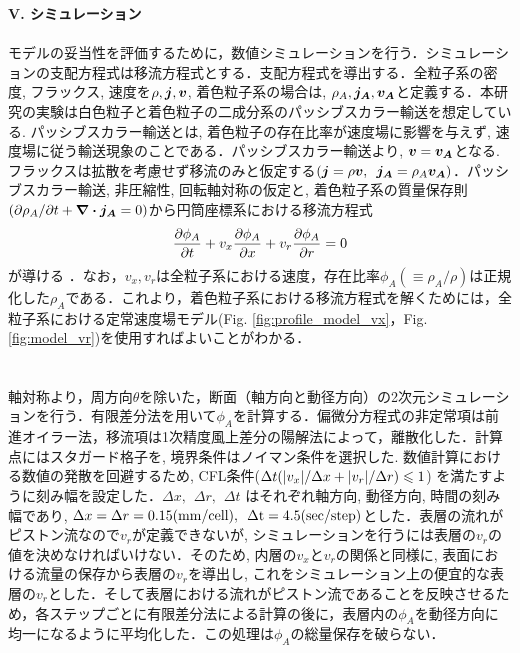 \documentclass[prl,twocolumn,superscriptaddress]{revtex4}
\begin{document}
{\bf V. シミュレーション} \\
 \\
モデルの妥当性を評価するために，数値シミュレーションを行う．シミュレーションの支配方程式は移流方程式とする．支配方程式を導出する．全粒子系の密度, フラックス, 速度を$\rho, \vb*{j}, \vb*{v}$, 着色粒子系の場合は, $\rho_A, \vb*{j_A}, \vb*{v_A}$と定義する．本研究の実験は白色粒子と着色粒子の二成分系のパッシブスカラー輸送を想定している. パッシブスカラー輸送とは, 着色粒子の存在比率が速度場に影響を与えず, 速度場に従う輸送現象のことである．パッシブスカラー輸送より, $\vb*{v} = \vb*{v_A}$となる. フラックスは拡散を考慮せず移流のみと仮定する$(\vb*{j} = \rho\vb*{v},\hspace{5pt}\vb*{j_A} = \rho_A\vb*{v_A})$．パッシブスカラー輸送, 非圧縮性, 回転軸対称の仮定と, 着色粒子系の質量保存則$\qty(\partial\rho_A/\partial t+\div{\vb*{j_A}}=0)$から円筒座標系における移流方程式 
\begin{equation} \label{eq:2Dae}
\pdv{\phi_A}{t}+v_x\pdv{\phi_A}{x}+v_r\pdv{\phi_A}{r} = 0
\end{equation}
が導ける \cite{supplement}．なお，$v_x, v_r$は全粒子系における速度，存在比率$\phi_A(\equiv\rho_A/\rho)$は正規化した$\rho_A$である．これより，着色粒子系における移流方程式を解くためには，全粒子系における定常速度場モデル(Fig. \ref{fig:profile_model_vx}，Fig. \ref{fig:model_vr})を使用すればよいことがわかる．\\
\\
 \\
軸対称より，周方向$\theta$を除いた，断面（軸方向と動径方向）の2次元シミュレーションを行う．有限差分法を用いて$\phi_A$を計算する．偏微分方程式の非定常項は前進オイラー法，移流項は1次精度風上差分の陽解法によって，離散化した．計算点にはスタガード格子を, 境界条件はノイマン条件を選択した. 数値計算における数値の発散を回避するため, CFL条件($\Delta t\qty(|v_x|/\Delta x+|v_r|/\Delta r)\leqslant1$) \cite{supplement, LeVeque07:FDM}を満たすように刻み幅を設定した．$\Delta x,\hspace{5pt}\Delta r,\hspace{5pt}\Delta t$ はそれぞれ軸方向, 動径方向, 時間の刻み幅であり, $\Delta x = \Delta r = 0.15 \rm{(mm/cell)}, \hspace{5pt}\Delta t = 4.5 (\rm{sec/step})$とした．表層の流れがピストン流なので$v_r$が定義できないが, シミュレーションを行うには表層の$v_r$の値を決めなければいけない．そのため, 内層の$v_x$と$v_r$の関係と同様に, 表面における流量の保存から表層の$v_r$を導出し, これをシミュレーション上の便宜的な表層の$v_r$とした．そして表層における流れがピストン流であることを反映させるため，各ステップごとに有限差分法による計算の後に，表層内の$\phi_A$を動径方向に均一になるように平均化した．この処理は$\phi_A$の総量保存を破らない．\\
\end{document}
